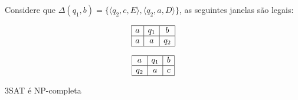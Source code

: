 \begin{example}
  \label{ex:janela}
  Considere que $\Delta(q_1, b) = \{\langle q_2, c, E\rangle, \langle q_2, a, D \rangle\}$, as seguintes janelas são legais:

  \begin{displaymath}
    \begin{array}{|c|c|c|}
      \hline
      a & q_1 & b \\
      \hline
      a & a & q_2 \\
      \hline
    \end{array}
  \end{displaymath}

    \begin{displaymath}
    \begin{array}{|c|c|c|}
      \hline
      a & q_1 & b \\
      \hline
      q_2 & a & c \\
      \hline
    \end{array}
  \end{displaymath}

\end{example}

\begin{corollary}
  3SAT é NP-completa
\end{corollary}

